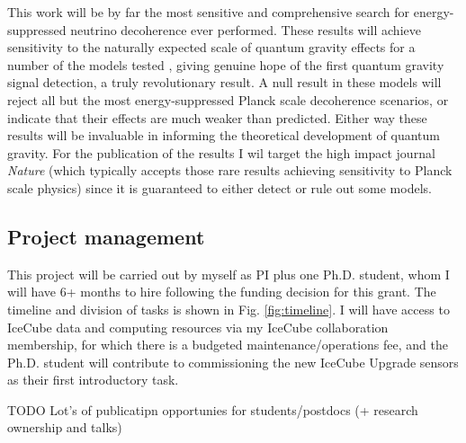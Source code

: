 \documentclass[a4paper,11pt]{article}
\begin{document}
This work will be by far the most sensitive and comprehensive search for energy-suppressed neutrino decoherence ever performed. These results will achieve sensitivity to the naturally expected scale of quantum gravity effects for a number of the models tested , giving genuine hope of the first quantum gravity signal detection, a truly revolutionary result. A null result in these models will reject all but the most energy-suppressed Planck scale decoherence scenarios, or indicate that their effects are much weaker than predicted. Either way these results will be invaluable in informing the theoretical development of quantum gravity. For the publication of the results I wil target the high impact journal \textit{Nature} (which typically accepts those rare results achieving sensitivity to Planck scale physics) since it is guaranteed to either detect or rule out some models. \\




\subsection{Project management}

This project will be carried out by myself as PI plus one Ph.D. student, whom I will have 6+ months to hire following the funding decision for this grant. The timeline and division of tasks is shown in Fig. \ref{fig:timeline}. I will have access to IceCube data and computing resources via my IceCube collaboration membership, for which there is a budgeted maintenance/operations fee, and the Ph.D. student will contribute to commissioning the new IceCube Upgrade sensors as their first introductory task. 

TODO Lot's of publicatipn opportunies for students/postdocs (+ research ownership and talks) \\
\end{document}
